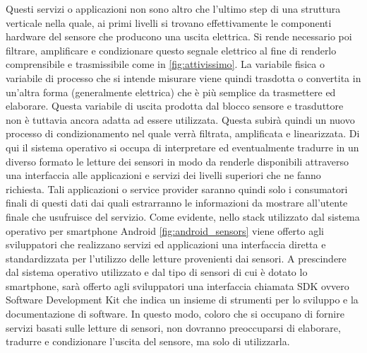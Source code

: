 Questi servizi o applicazioni non sono altro che l'ultimo step di una struttura verticale nella quale, ai primi livelli si trovano effettivamente le componenti hardware del sensore che producono una uscita elettrica. Si rende necessario poi filtrare, amplificare e condizionare questo segnale elettrico al fine di renderlo comprensibile e trasmissibile come in \autoref{fig:attivissimo}. La variabile fisica o variabile di processo che si intende misurare viene quindi trasdotta o convertita in un'altra forma (generalmente elettrica) che è più semplice da trasmettere ed elaborare. Questa variabile di uscita prodotta dal blocco sensore e trasduttore non è tuttavia ancora adatta ad essere utilizzata. Questa subirà quindi un nuovo processo di condizionamento nel quale verrà filtrata, amplificata e linearizzata. Di qui il sistema operativo si occupa di interpretare ed eventualmente tradurre in un diverso formato le letture dei sensori in modo da renderle disponibili attraverso una interfaccia alle applicazioni e servizi dei livelli superiori che ne fanno richiesta. Tali applicazioni o service provider saranno quindi solo i consumatori finali di questi dati dai quali estrarranno le informazioni da mostrare all'utente finale che usufruisce del servizio.
Come evidente, nello stack utilizzato dal sistema operativo per smartphone Android \autoref{fig:android_sensors} viene offerto agli sviluppatori che realizzano servizi ed applicazioni una interfaccia diretta e standardizzata per l'utilizzo delle letture provenienti dai sensori. A prescindere dal sistema operativo utilizzato e dal tipo di sensori di cui è dotato lo smartphone, sarà offerto agli sviluppatori una interfaccia chiamata SDK ovvero Software Development Kit che indica un insieme di strumenti per lo sviluppo e la documentazione di software. In questo modo, coloro che si occupano di fornire servizi basati sulle letture di sensori, non dovranno preoccuparsi di elaborare, tradurre e condizionare l'uscita del sensore, ma solo di utilizzarla. \cite{developer:android} \cite{developer:apple}

